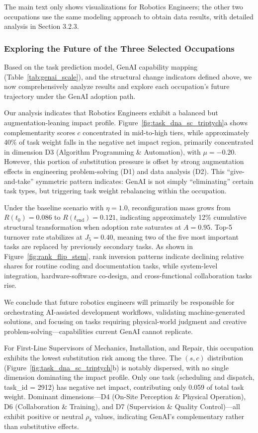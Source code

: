 The main text only shows visualizations for Robotics Engineers; the other two occupations use the same modeling approach to obtain data results, with detailed analysis in Section 3.2.3.
\subsubsection{Exploring the Future of the Three Selected Occupations}

Based on the task prediction model, GenAI capability mapping (Table~\ref{tab:genai_scale}), and the structural change indicators defined above, we now comprehensively analyze results and explore each occupation's future trajectory under the GenAI adoption path.

Our analysis indicates that Robotics Engineers exhibit a balanced but augmentation-leaning impact profile. Figure~\ref{fig:task_dna_sc_triptych}a shows complementarity scores $c$ concentrated in mid-to-high tiers, while approximately 40\% of task weight falls in the negative net impact region, primarily concentrated in dimension D3 (Algorithm Programming \& Automation), with $\mu = -0.20$. However, this portion of substitution pressure is offset by strong augmentation effects in engineering problem-solving (D1) and data analysis (D2). This ``give-and-take'' symmetric pattern indicates: GenAI is not simply ``eliminating'' certain task types, but triggering task weight rebalancing within the occupation.

Under the baseline scenario with $\eta = 1.0$, reconfiguration mass grows from $R(t_0) = 0.086$ to $R(t_{\text{end}}) = 0.121$, indicating approximately 12\% cumulative structural transformation when adoption rate saturates at $A = 0.95$. Top-5 turnover rate stabilizes at $J_5 = 0.40$, meaning two of the five most important tasks are replaced by previously secondary tasks. As shown in Figure~\ref{fig:rank_flip_stem}, rank inversion patterns indicate declining relative shares for routine coding and documentation tasks, while system-level integration, hardware-software co-design, and cross-functional collaboration tasks rise.

We conclude that future robotics engineers will primarily be responsible for orchestrating AI-assisted development workflows, validating machine-generated solutions, and focusing on tasks requiring physical-world judgment and creative problem-solving---capabilities current GenAI cannot replicate.

For First-Line Supervisors of Mechanics, Installation, and Repair, this occupation exhibits the lowest substitution risk among the three. The $(s,c)$ distribution (Figure~\ref{fig:task_dna_sc_triptych}b) is notably dispersed, with no single dimension dominating the impact profile. Only one task (scheduling and dispatch, task\_id = 2912) has negative net impact, contributing only 0.059 of total task weight. Dominant dimensions---D4 (On-Site Perception \& Physical Operation), D6 (Collaboration \& Training), and D7 (Supervision \& Quality Control)---all exhibit positive or neutral $\rho_k$ values, indicating GenAI's complementary rather than substitutive effects.

